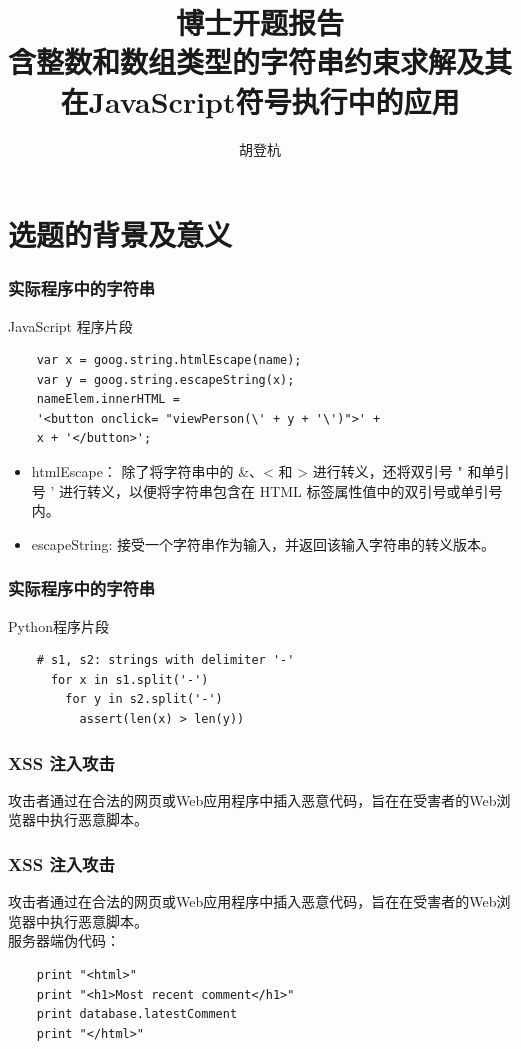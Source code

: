 \documentclass[landscape]{beamer}
\title{博士开题报告\\含整数和数组类型的字符串约束求解及其在JavaScript符号执行中的应用}
\author{胡登杭}
\institute{导师：吴志林}
\begin{document}
\frame{\titlepage}

\begin{frame}
  \tableofcontents
\end{frame}

\section{选题的背景及意义}
\begin{frame}[fragile]
  \frametitle{实际程序中的字符串}
  JavaScript 程序片段
  \begin{lstlisting}
    var x = goog.string.htmlEscape(name);
    var y = goog.string.escapeString(x);
    nameElem.innerHTML =
    '<button onclick= "viewPerson(\' + y + '\')">' +
    x + '</button>';
  \end{lstlisting}
  \begin{itemize}
    \item htmlEscape： 除了将字符串中的 \&、< 和 > 进行转义，还将双引号 " 和单引号 ' 进行转义，以便将字符串包含在 HTML 标签属性值中的双引号或单引号内。
    \item escapeString: 接受一个字符串作为输入，并返回该输入字符串的转义版本。
  \end{itemize}
\end{frame}
\begin{frame}[fragile]
  \frametitle{实际程序中的字符串}
  Python程序片段
  \begin{lstlisting}
    # s1, s2: strings with delimiter '-'
      for x in s1.split('-')
        for y in s2.split('-')
          assert(len(x) > len(y))
  \end{lstlisting}
\end{frame}
\begin{frame}[fragile,t]

  \frametitle{XSS 注入攻击}
  攻击者通过在合法的网页或Web应用程序中插入恶意代码，旨在在受害者的Web浏览器中执行恶意脚本。
\end{frame}

\begin{frame}[fragile,t]
  \frametitle{XSS 注入攻击}
  攻击者通过在合法的网页或Web应用程序中插入恶意代码，旨在在受害者的Web浏览器中执行恶意脚本。\\
  \vspace{\baselineskip}
  服务器端伪代码：
  \begin{lstlisting}
    print "<html>"
    print "<h1>Most recent comment</h1>"
    print database.latestComment
    print "</html>"
  \end{lstlisting}
\end{frame}
\end{document}
